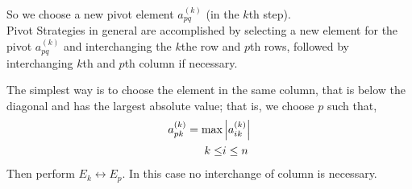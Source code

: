 \documentclass[12pt,class=book,crop=false]{standalone}
\begin{document}
So we choose a new pivot element \( a_{pq}^{(k)} \) (in the \( k \)th step).\\

Pivot Strategies in general are accomplished by selecting a new element for the pivot \( a_{pq}^{(k)} \) and interchanging the \( k \)the row and \( p \)th rows, followed by interchanging \( k \)th and \( p \)th column if necessary.

The simplest way is to choose the element in the same column, that is below the diagonal and has the largest absolute value; that is, we choose \( p \) such that,
\[
    a_{pk}^{(k)}=\begin{aligned}[t]
        \text{max} & \left\vert a_{ik}^{(k)}\right\vert \\
        k\leq      & i\leq n
    \end{aligned}
\]
Then perform \( E_k\longleftrightarrow E_p \). In this case no interchange of column is necessary.
\end{document}
